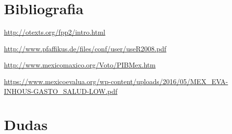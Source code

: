 \documentclass[]{book}
\theoremstyle{definition}
\theoremstyle{definition}
\theoremstyle{definition}
\theoremstyle{remark}
\begin{document}
\section{Bibliografia}\label{bibliografia}

\url{http://otexts.org/fpp2/intro.html}

\url{http://www.pfaffikus.de/files/conf/user/useR2008.pdf}

\url{http://www.mexicomaxico.org/Voto/PIBMex.htm}

\url{https://www.mexicoevalua.org/wp-content/uploads/2016/05/MEX_EVA-INHOUS-GASTO_SALUD-LOW.pdf}

\section{Dudas}\label{dudas}


\end{document}

